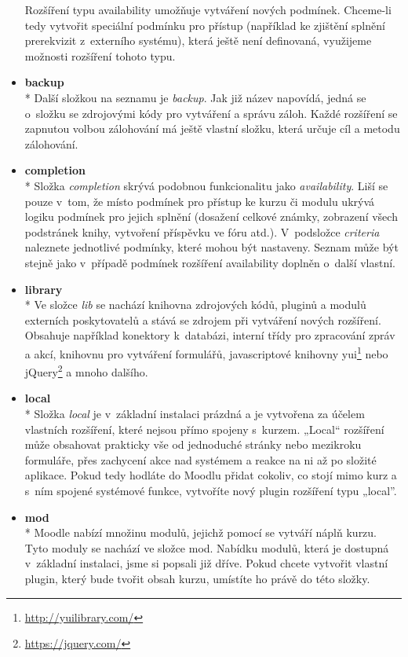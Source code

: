 \documentclass[
print,
  11pt,
  table,   
  nolof,    
  nolot,
  oneside,
  draft
]{fithesis3}
\begin{document}
\begin{itemize}
Rozšíření typu availability umožňuje vytváření nových podmínek. Chceme-li tedy vytvořit speciální podmínku pro přístup (například ke zjištění splnění prerekvizit z~externího systému), která ještě není definovaná, využijeme možnosti rozšíření tohoto typu.

\item \textbf{backup} \\*
Další složkou na seznamu je \emph{backup}. Jak již název napovídá, jedná se o~složku se zdrojovými kódy pro vytváření a správu záloh. Každé rozšíření se zapnutou volbou zálohování má ještě vlastní složku, kte\-rá určuje cíl a metodu zálohování.

\item \textbf{completion} \\*
Složka \emph{completion} skrývá podobnou funkcionalitu jako \emph{availability}. Li\-ší se pouze v~tom, že místo podmínek pro přístup ke kurzu či modulu ukrývá logiku podmínek pro jejich splnění (dosažení celkové známky, zobrazení všech podstránek knihy, vytvoření příspěvku ve fóru atd.). V~podsložce \emph{criteria} naleznete jednotlivé podmínky, které mohou být nastaveny. Seznam může být stejně jako v~případě podmínek rozšíření availability doplněn o~další vlastní.

\item \textbf{library} \\*
Ve složce \emph{lib} se nachází knihovna zdrojových kódů, pluginů a modulů externích poskytovatelů a stává se zdrojem při vytváření nových rozšíření. Obsahuje například konektory k~databázi, interní tří\-dy pro zpracování zpráv a akcí, knihovnu pro vytváření formulářů, javascriptové knihovny yui\footnote{\url{http://yuilibrary.com/}} nebo jQuery\footnote{\url{https://jquery.com/}} a mnoho dalšího. 

\item \textbf{local} \\*
Složka \emph{local} je v~základní instalaci prázdná a je vytvořena za účelem vlastních rozšíření, které nejsou přímo spojeny s~kurzem. „Local“ rozšíření může obsahovat prakticky vše od jednoduché stránky nebo mezikroku formuláře, přes zachycení akce nad systémem a reakce na ni až po složité aplikace. Pokud tedy hodláte do Moodlu přidat cokoliv, co stojí mimo kurz a s~ním spojené systémové funkce, vytvoříte nový plugin rozšíření typu „local”.

\item \textbf{mod} \\*
Moodle nabízí množinu modulů, jejichž pomocí se vytváří náplň kur\-zu. Tyto moduly se nachází ve složce mod. Nabídku modulů, která je dostupná v~základní instalaci, jsme si popsali již dříve. Pokud chcete vytvořit vlastní plugin, který bude tvořit obsah kurzu, umístíte ho právě do této složky. 


\end{itemize}
\end{document}

